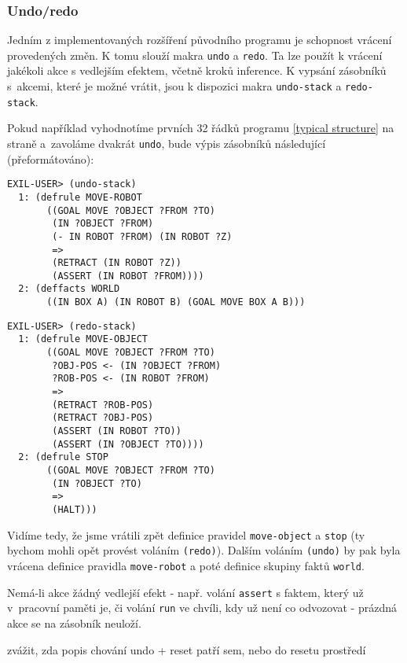 \subsubsection{Undo/redo}

Jedním z implementovaných rozšíření původního programu je schopnost vrácení
provedených změn. K tomu slouží makra \verb|undo| a \verb|redo|. Ta lze použít k
vrácení jakékoli akce s vedlejším efektem, včetně kroků inference. K vypsání
zásobníků s~akcemi, které je možné vrátit, jsou k dispozici makra
\verb|undo-stack| a \verb|redo-stack|.

Pokud například vyhodnotíme prvních 32 řádků programu \ref{typical structure} na
straně \pageref{typical structure} a~zavoláme dvakrát \verb|undo|, bude výpis
zásobníků následující (přeformátováno):
\begin{verbatim}
EXIL-USER> (undo-stack)
  1: (defrule MOVE-ROBOT
       ((GOAL MOVE ?OBJECT ?FROM ?TO)
        (IN ?OBJECT ?FROM)
        (- IN ROBOT ?FROM) (IN ROBOT ?Z)
        =>
        (RETRACT (IN ROBOT ?Z))
        (ASSERT (IN ROBOT ?FROM))))
  2: (deffacts WORLD
       ((IN BOX A) (IN ROBOT B) (GOAL MOVE BOX A B)))
\end{verbatim}
\begin{verbatim}
EXIL-USER> (redo-stack)
  1: (defrule MOVE-OBJECT
       ((GOAL MOVE ?OBJECT ?FROM ?TO)
        ?OBJ-POS <- (IN ?OBJECT ?FROM)
        ?ROB-POS <- (IN ROBOT ?FROM)
        =>
        (RETRACT ?ROB-POS)
        (RETRACT ?OBJ-POS)
        (ASSERT (IN ROBOT ?TO))
        (ASSERT (IN ?OBJECT ?TO))))
  2: (defrule STOP
       ((GOAL MOVE ?OBJECT ?FROM ?TO)
        (IN ?OBJECT ?TO)
        =>
        (HALT)))
\end{verbatim}
Vidíme tedy, že jsme vrátili zpět definice pravidel \verb|move-object| a
\verb|stop| (ty bychom mohli opět provést voláním \verb|(redo)|). Dalším voláním
\verb|(undo)| by pak byla vrácena definice pravidla \verb|move-robot| a poté
definice skupiny faktů \verb|world|.

Nemá-li akce žádný vedlejší efekt - např. volání \verb|assert| s faktem, který
už v~pracovní paměti je, či volání \verb|run| ve chvíli, kdy už není co
odvozovat - prázdná akce se na zásobník neuloží.

\begin{framed}
zvážit, zda popis chování undo + reset patří sem, nebo do resetu prostředí
\end{framed}
